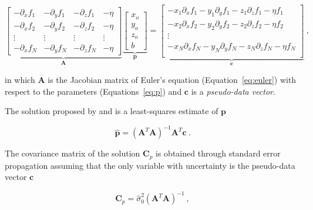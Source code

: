 \begin{equation}
  \underbrace{
    \begin{bmatrix}
      -\partial_x f_1 & -\partial_y f_1 & -\partial_z f_1 & -\eta \\
      -\partial_x f_2 & -\partial_y f_2 & -\partial_z f_2 & -\eta \\
      \vdots & \vdots & \vdots & \vdots \\
      -\partial_x f_N & -\partial_y f_N & -\partial_z f_N & -\eta
    \end{bmatrix}
  }_{\mathbf{A}}
  \underbrace{
    \begin{bmatrix}
      x_o \\ y_o \\ z_o \\ b
    \end{bmatrix}
  }_{\mathbf{p}}
  =
  \underbrace{
    \begin{bmatrix}
      -x_1\partial_x f_1 - y_1\partial_y f_1 - z_1\partial_z f_1 - \eta f_1 \\
      -x_2\partial_x f_2 - y_2\partial_y f_2 - z_2\partial_z f_2 - \eta f_2 \\
      \vdots \\
      -x_N\partial_x f_N - y_N\partial_y f_N - z_N\partial_z f_N - \eta f_N \\
    \end{bmatrix}
  }_{\mathbf{c}}
  \ ,
  \label{eq:deconv-system}
\end{equation}

\noindent
in which $\mathbf{A}$ is the Jacobian matrix of Euler's equation
(Equation~\ref{eq:euler}) with respect to the parameters
(Equations~\ref{eq:p})
and $\mathbf{c}$ is a \textit{pseudo-data vector}.

The solution proposed by \citet{Thompson1982} and \citet{Reid1990} is a
least-squares estimate of $\mathbf{p}$

\begin{equation}
  \hat{\mathbf{p}} = \left(\mathbf{A}^T\mathbf{A}\right)^{-1}
  \mathbf{A}^T\mathbf{c}
  \ .
  \label{eq:deconv-p}
\end{equation}

\noindent
The covariance matrix of the solution $\mathbf{C}_p$ is obtained through
standard error propagation assuming that the only variable with uncertainty
is the pseudo-data vector $\mathbf{c}$

\begin{equation}
  \mathbf{C}_p = \hat{\sigma}_0^2 \left(\mathbf{A}^T\mathbf{A}\right)^{-1}
  \ ,
  \label{eq:deconv-cov}
\end{equation}

